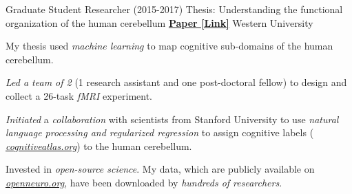 \begin{cventries}
  \cventry
    {Graduate Student Researcher (2015-2017)} %
    {Thesis: Understanding the functional organization of the human cerebellum}
    {\href{http://ivrylab.berkeley.edu/uploads/4/1/1/5/41152143/functional_boundaries_in_the_human_cerebellum.pdf}{\textbf{Paper [Link]}}}
    {Western University} %
    {
      \begin{cvitems} %
        \item {My thesis used \textit{machine learning} to map cognitive sub-domains of the human cerebellum.}
      	\item {\textit{Led a team of 2} (1 research assistant and one post-doctoral fellow) to design and collect a 26-task \textit{fMRI} experiment.}
      	\item {\textit{Initiated} a \textit{collaboration} with scientists from Stanford University to use \textit{natural language processing and regularized regression} to assign cognitive labels ( {\href{https://cognitiveatlas.org/}{\textit{cognitiveatlas.org}}}) to the human cerebellum.}
      	\item {Invested in \textit{open-source science}. My data, which are publicly available on {\href{https://openneuro.org/datasets/ds002105/versions/1.1.0}{\textit{openneuro.org}}}, have been downloaded by \textit{hundreds of researchers}.}
      \end{cvitems}
    }

\end{cventries}
